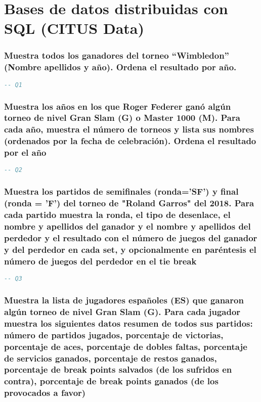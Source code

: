 \section{Bases de datos distribuidas con SQL (CITUS Data)}

\subsubsection{Muestra todos los ganadores del torneo ``Wimbledon'' (Nombre apellidos y año). Ordena el resultado por año.}

\begin{lstlisting}[language=SQL]
-- Q1
\end{lstlisting}





\subsubsection{Muestra los años en los que Roger Federer ganó algún torneo de nivel Gran Slam (G) o Master 1000 (M). Para cada año, muestra el número de torneos y lista sus nombres (ordenados por la fecha de celebración). Ordena el resultado por el año}

\begin{lstlisting}[language=SQL]
-- Q2
\end{lstlisting}





\subsubsection{Muestra los partidos de semiﬁnales (ronda='SF') y ﬁnal (ronda = 'F') del torneo de "Roland Garros" del 2018. Para cada partido muestra la ronda, el tipo de desenlace, el nombre y apellidos del ganador y el nombre y apellidos del perdedor y el resultado con el número de juegos del ganador y del perdedor en cada set, y opcionalmente en paréntesis el número de juegos del perdedor en el tie break}

\begin{lstlisting}[language=SQL]
-- Q3
\end{lstlisting}





\subsubsection{Muestra la lista de jugadores españoles (ES) que ganaron algún torneo de nivel Gran Slam (G). Para cada jugador muestra los siguientes datos resumen de todos sus partidos: número de partidos jugados, porcentaje de victorias, porcentaje de aces, porcentaje de dobles faltas, porcentaje de servicios ganados, porcentaje de restos ganados, porcentaje de break points salvados (de los sufridos en contra), porcentaje de break points ganados (de los provocados a favor)}


